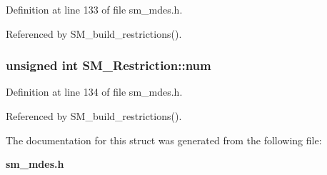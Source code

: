Definition at line 133 of file sm\_\-mdes.h.

Referenced by SM\_\-build\_\-restrictions().
\subsubsection{\setlength{\rightskip}{0pt plus 5cm}unsigned int \bf{SM\_\-Restriction::num}}\label{structSM__Restriction_f35ef6269b70ebb9724091cda34c3d05}




Definition at line 134 of file sm\_\-mdes.h.

Referenced by SM\_\-build\_\-restrictions().

The documentation for this struct was generated from the following file:\begin{CompactItemize}
\item 
\bf{sm\_\-mdes.h}\end{CompactItemize}
